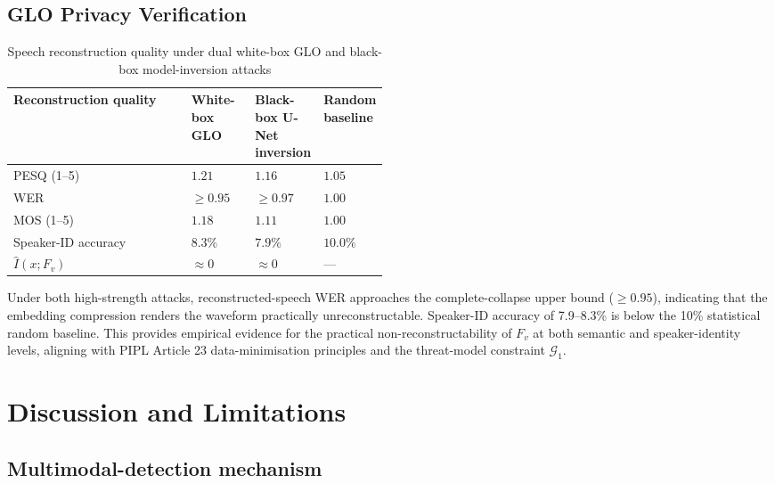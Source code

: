 \documentclass[11pt, a4paper]{article}
\begin{document}
\subsection{GLO Privacy Verification}

\begin{table}[htbp]
\centering
\caption{Speech reconstruction quality under dual white-box GLO and black-box model-inversion attacks}
\label{tab:privacy_attack-en}
\small
\renewcommand{\arraystretch}{1.25}
\begin{tabular}{l>{\centering\arraybackslash}p{0.17\linewidth}>{\centering\arraybackslash}p{0.16\linewidth}>{\centering\arraybackslash}p{0.16\linewidth}}
\toprule
\textbf{Reconstruction quality} & \textbf{White-box GLO} & \textbf{Black-box U-Net inversion} & \textbf{Random baseline} \\
\midrule
PESQ (1--5) & $1.21$ & $1.16$ & $1.05$ \\
WER & $\ge 0.95$ & $\ge 0.97$ & $1.00$ \\
MOS (1--5) & $1.18$ & $1.11$ & $1.00$ \\
Speaker-ID accuracy & $8.3\%$ & $7.9\%$ & $10.0\%$ \\
$\hat{I}(x; F_v)$ & $\approx 0$ & $\approx 0$ & --- \\
\bottomrule
\end{tabular}
\end{table}

Under both high-strength attacks, reconstructed-speech WER approaches the complete-collapse upper bound ($\ge 0.95$), indicating that the embedding compression renders the waveform practically unreconstructable. Speaker-ID accuracy of 7.9--8.3\% is below the 10\% statistical random baseline. This provides empirical evidence for the practical non-reconstructability of $F_v$ at both semantic and speaker-identity levels, aligning with PIPL Article 23 data-minimisation principles and the threat-model constraint $\mathcal{G}_1$.

\section{Discussion and Limitations}

\subsection{Multimodal-detection mechanism}
\end{document}

